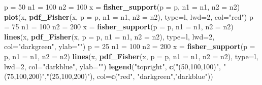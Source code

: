 \documentclass[
]{article}
\newenvironment{Shaded}{\begin{snugshade}}{\end{snugshade}}
\newcommand{\AttributeTok}[1]{\textcolor[rgb]{0.13,0.29,0.53}{#1}}
\newcommand{\DecValTok}[1]{\textcolor[rgb]{0.00,0.00,0.81}{#1}}
\newcommand{\FunctionTok}[1]{\textcolor[rgb]{0.13,0.29,0.53}{\textbf{#1}}}
\newcommand{\NormalTok}[1]{#1}
\newcommand{\OtherTok}[1]{\textcolor[rgb]{0.56,0.35,0.01}{#1}}
\newcommand{\StringTok}[1]{\textcolor[rgb]{0.31,0.60,0.02}{#1}}
\begin{document}
\begin{Shaded}
\begin{Highlighting}[]
\NormalTok{p }\OtherTok{=} \DecValTok{50}
\NormalTok{n1 }\OtherTok{=} \DecValTok{100}
\NormalTok{n2 }\OtherTok{=} \DecValTok{100}
\NormalTok{x }\OtherTok{=} \FunctionTok{fisher\_support}\NormalTok{(}\AttributeTok{p =}\NormalTok{ p, }\AttributeTok{n1 =}\NormalTok{ n1, }\AttributeTok{n2 =}\NormalTok{ n2)}
\FunctionTok{plot}\NormalTok{(x, }\FunctionTok{pdf\_Fisher}\NormalTok{(x, }\AttributeTok{p =}\NormalTok{ p, }\AttributeTok{n1 =}\NormalTok{ n1, }\AttributeTok{n2 =}\NormalTok{ n2), }\AttributeTok{type=}\StringTok{\textquotesingle{}l\textquotesingle{}}\NormalTok{, }\AttributeTok{lwd=}\DecValTok{2}\NormalTok{, }\AttributeTok{col=}\StringTok{"red"}\NormalTok{)}
\NormalTok{p }\OtherTok{=} \DecValTok{75}
\NormalTok{n1 }\OtherTok{=} \DecValTok{100}
\NormalTok{n2 }\OtherTok{=} \DecValTok{200}
\NormalTok{x }\OtherTok{=} \FunctionTok{fisher\_support}\NormalTok{(}\AttributeTok{p =}\NormalTok{ p, }\AttributeTok{n1 =}\NormalTok{ n1, }\AttributeTok{n2 =}\NormalTok{ n2)}
\FunctionTok{lines}\NormalTok{(x, }\FunctionTok{pdf\_Fisher}\NormalTok{(x, }\AttributeTok{p =}\NormalTok{ p, }\AttributeTok{n1 =}\NormalTok{ n1, }\AttributeTok{n2 =}\NormalTok{ n2), }\AttributeTok{type=}\StringTok{\textquotesingle{}l\textquotesingle{}}\NormalTok{, }\AttributeTok{lwd=}\DecValTok{2}\NormalTok{, }\AttributeTok{col=}\StringTok{"darkgreen"}\NormalTok{, }\AttributeTok{ylab=}\StringTok{""}\NormalTok{)}
\NormalTok{p }\OtherTok{=} \DecValTok{25}
\NormalTok{n1 }\OtherTok{=} \DecValTok{100}
\NormalTok{n2 }\OtherTok{=} \DecValTok{200}
\NormalTok{x }\OtherTok{=} \FunctionTok{fisher\_support}\NormalTok{(}\AttributeTok{p =}\NormalTok{ p, }\AttributeTok{n1 =}\NormalTok{ n1, }\AttributeTok{n2 =}\NormalTok{ n2)}
\FunctionTok{lines}\NormalTok{(x, }\FunctionTok{pdf\_Fisher}\NormalTok{(x, }\AttributeTok{p =}\NormalTok{ p, }\AttributeTok{n1 =}\NormalTok{ n1, }\AttributeTok{n2 =}\NormalTok{ n2), }\AttributeTok{type=}\StringTok{\textquotesingle{}l\textquotesingle{}}\NormalTok{, }\AttributeTok{lwd=}\DecValTok{2}\NormalTok{, }\AttributeTok{col=}\StringTok{"darkblue"}\NormalTok{, }\AttributeTok{ylab=}\StringTok{""}\NormalTok{)}
\FunctionTok{legend}\NormalTok{(}\StringTok{"topright"}\NormalTok{, }\FunctionTok{c}\NormalTok{(}\StringTok{"(50,100,100)"}\NormalTok{, }\StringTok{"(75,100,200)"}\NormalTok{,}\StringTok{"(25,100,200)"}\NormalTok{), }\AttributeTok{col=}\FunctionTok{c}\NormalTok{(}\StringTok{"red"}\NormalTok{, }\StringTok{"darkgreen"}\NormalTok{,}\StringTok{"darkblue"}\NormalTok{))}
\end{Highlighting}
\end{Shaded}
\end{document}
